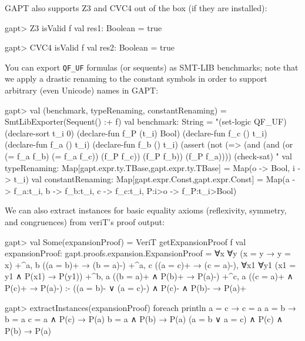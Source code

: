 \documentclass[a4paper,11pt]{book}
\begin{document}
GAPT also supports Z3 and CVC4 out of the box (if they are installed):
\begin{clilisting}
gapt> Z3 isValid f
val res1: Boolean = true

gapt> CVC4 isValid f
val res2: Boolean = true

\end{clilisting}

You can export \verb,QF_UF, formulas (or sequents) as SMT-LIB benchmarks;
note that we apply a drastic renaming to the constant symbols in order to
support arbitrary (even Unicode) names in GAPT:
\begin{clilisting}
gapt> val (benchmark, typeRenaming, constantRenaming) = SmtLibExporter(Sequent() :+ f)
val benchmark: String =
"(set-logic QF_UF)
(declare-sort t_i 0)
(declare-fun f_P (t_i) Bool)
(declare-fun f_c () t_i)
(declare-fun f_a () t_i)
(declare-fun f_b () t_i)
(assert
  (not
    (=> (and (and (or (= f_a f_b) (= f_a f_c)) (f_P f_c)) (f_P f_b))
      (f_P f_a))))
(check-sat)
"
val typeRenaming: Map[gapt.expr.ty.TBase,gapt.expr.ty.TBase] = Map(o -> Bool, i -> t_i)
val constantRenaming: Map[gapt.expr.Const,gapt.expr.Const] = Map(a -> f_a:t_i, b -> f_b:t_i, c -> f_c:t_i, P:i>o -> f_P:t_i>Bool)

\end{clilisting}

We can also extract instances for basic equality axioms (reflexivity, symmetry,
and congruences) from veriT's proof output:
\begin{clilisting}
gapt> val Some(expansionProof) = VeriT getExpansionProof f
val expansionProof: gapt.proofs.expansion.ExpansionProof =
∀x ∀y (x = y → y = x)
  +^{a, b} ((a = b)+ → (b = a)-)
  +^{a, c} ((a = c)+ → (c = a)-),
∀x1 ∀y1 (x1 = y1 ∧ P(x1) → P(y1))
  +^{b, a} ((b = a)+ ∧ P(b)+ → P(a)-)
  +^{c, a} ((c = a)+ ∧ P(c)+ → P(a)-)
:-
((a = b)- ∨ (a = c)-) ∧ P(c)- ∧ P(b)- → P(a)+

gapt> extractInstances(expansionProof) foreach println
a = c → c = a
a = b → b = a
c = a ∧ P(c) → P(a)
b = a ∧ P(b) → P(a)
(a = b ∨ a = c) ∧ P(c) ∧ P(b) → P(a)

\end{clilisting}
\end{document}

